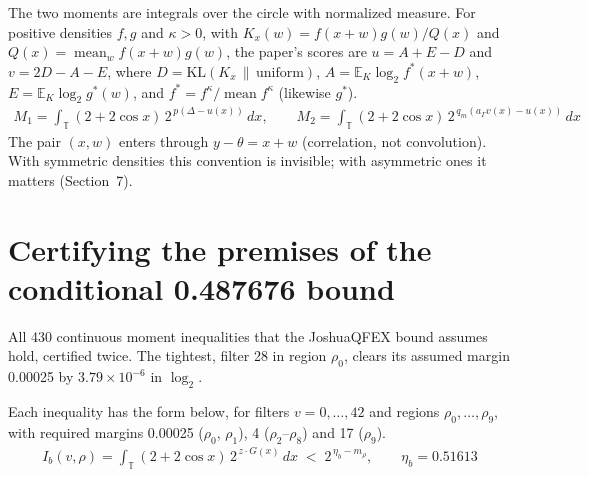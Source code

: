 \documentclass[11pt]{article}
\DeclareMathOperator{\mean}{mean}
\newcommand{\E}{\mathbb{E}}
\newcommand{\KL}{\mathrm{KL}}
\theoremstyle{plain}
\begin{document}
The two moments are integrals over the circle with normalized measure. For positive densities $f, g$ and $\kappa > 0$, with $K_x(w) = f(x+w)g(w)/Q(x)$ and $Q(x) = \mean_w f(x+w)g(w)$, the paper's scores are $u = A + E - D$ and $v = 2D - A - E$, where $D = \KL(K_x \,\|\, \mathrm{uniform})$, $A = \E_K \log_2 f^*(x+w)$, $E = \E_K \log_2 g^*(w)$, and $f^* = f^\kappa / \mean f^\kappa$ (likewise $g^*$).
\begin{gather*}
M_1 = \int_{\mathbb T} (2+2\cos x)\, 2^{\,p(\Delta - u(x))}\, dx, \qquad M_2 = \int_{\mathbb T} (2+2\cos x)\, 2^{\,q_m(a_\Gamma v(x) - u(x))}\, dx
\end{gather*}
The pair $(x, w)$ enters through $y - \theta = x + w$ (correlation, not convolution). With symmetric densities this convention is invisible; with asymmetric ones it matters (Section~7).

\section{Certifying the premises of the conditional 0.487676 bound}

All 430 continuous moment inequalities that the JoshuaQFEX bound assumes hold, certified twice. The tightest, filter 28 in region $\rho_0$, clears its assumed margin 0.00025 by $3.79\times10^{-6}$ in $\log_2$.

Each inequality has the form below, for filters $v = 0,\dots,42$ and regions $\rho_0,\dots,\rho_9$, with required margins 0.00025 ($\rho_0$, $\rho_1$), 4 ($\rho_2$--$\rho_8$) and 17 ($\rho_9$).
\begin{gather*}
I_b(v,\rho) = \int_{\mathbb T} (2+2\cos x)\, 2^{\,z\cdot G(x)}\, dx \;<\; 2^{\,\eta_b - m_\rho}, \qquad \eta_b = 0.51613
\end{gather*}
\end{document}
